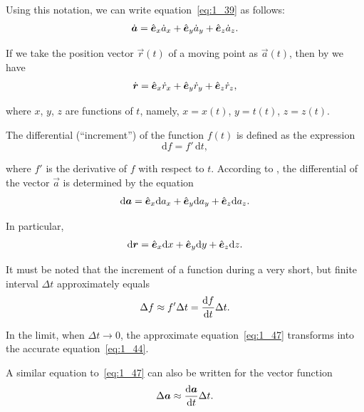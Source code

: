 \noindent
Using this notation, we can write equation~\eqref{eq:1_39} as follows:
\begin{equation}\label{eq:1_42}
\dot{\boldsymbol{a}} = \hat{\boldsymbol{e}}_{x}\dot{a}_x + \hat{\boldsymbol{e}}_{y}\dot{a}_y + \hat{\boldsymbol{e}}_{z}\dot{a}_z.
\end{equation}

\noindent
If we take the position vector $\vec{r}(t)$ of a moving point as $\vec{a}(t)$, then by  we have
\begin{equation}\label{eq:1_43}
\dot{\boldsymbol{r}} = \hat{\boldsymbol{e}}_{x}\dot{r}_x + \hat{\boldsymbol{e}}_{y}\dot{r}_y + \hat{\boldsymbol{e}}_{z}\dot{r}_z,
\end{equation}

\noindent
where $x$, $y$, $z$ are functions of $t$, namely, $x=x(t)$, $y=t(t)$, $z=z(t)$.

The differential (``increment'') of the function $f(t)$ is defined as the expression
\begin{equation}\label{eq:1_44}
\mathrm{d}f = f'\, \mathrm{d}t,
\end{equation}

\noindent
where $f'$ is the derivative of $f$ with respect to $t$.  According to , the differential of the vector $\vec{a}$ is determined by the equation
\begin{equation}\label{eq:1_45}
\mathrm{d}\boldsymbol{a} = \hat{\boldsymbol{e}}_{x}\mathrm{d}a_x + \hat{\boldsymbol{e}}_{y}\mathrm{d}a_y + \hat{\boldsymbol{e}}_{z}\mathrm{d}a_z.
\end{equation}

In particular,
\begin{equation}\label{eq:1_46}
\mathrm{d}\boldsymbol{r} = \hat{\boldsymbol{e}}_{x}\mathrm{d}x + \hat{\boldsymbol{e}}_{y}\mathrm{d}y + \hat{\boldsymbol{e}}_{z}\mathrm{d}z.
\end{equation}

It must be noted that the increment of a function during a very short, but finite interval $\Delta t$ approximately equals
\begin{equation}\label{eq:1_47}
\Delta f \approx f'\Delta t = \frac{\mathrm{d} f}{\mathrm{d} t}\Delta t.
\end{equation}

\noindent
In the limit, when $\Delta t\to 0$, the approximate equation~\eqref{eq:1_47} transforms into the accurate equation~\eqref{eq:1_44}.

A similar equation to~\eqref{eq:1_47} can also be written for the vector function
\begin{equation}\label{eq:1_48}
\Delta\boldsymbol{a} \approx \frac{\mathrm{d}\boldsymbol{a}}{\mathrm{d} t}\Delta t.
\end{equation}

